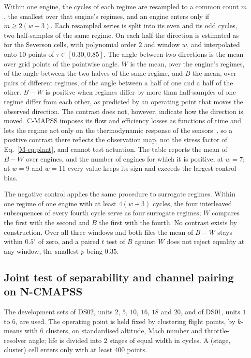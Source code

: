 \documentclass[12pt]{article}
\begin{document}
Within one engine, the cycles of each regime are resampled to a common count
$m$, the smallest over that engine's regimes, and an engine enters only if
$m\ge2(w+3)$. Each resampled series is split into its even and its odd
cycles, two half-samples of the same regime. On each half the direction is
estimated as for the Severson cells, with polynomial order $2$ and window $w$,
and interpolated onto $10$ points of $\tau\in[0.30,0.85]$. The angle between
two directions is the mean over grid points of the pointwise angle. $W$ is the
mean, over the engine's regimes, of the angle between the two halves of the
same regime, and $B$ the mean, over pairs of different regimes, of the angle
between a half of one and a half of the other. $B-W$ is positive when regimes
differ by more than half-samples of one regime differ from each other, as
predicted by an operating point that moves the observed direction. The
contrast does not, however, indicate how the direction is moved. C-MAPSS
imposes its flow and efficiency losses as functions of time and lets the
regime act only on the thermodynamic response of the
sensors~\cite{saxena2008}, so a positive contrast there reflects the
observation map, not the stress factor of Eq.~\eqref{M-eq:plant}, and cannot
test actuation. The table reports the mean of $B-W$ over engines, and the
number of engines for which it is positive, at $w=7$; at $w=9$ and $w=11$
every value keeps its sign and exceeds the largest control bias.

The negative control applies the same procedure to surrogate regimes. Within
one regime of one engine with at least $4(w+3)$ cycles, the four interleaved
subsequences of every fourth cycle serve as four surrogate regimes; $W$
compares the first with the second and $B$ the first with the fourth. No
contrast exists by construction. Over all three windows and both files the
mean of $B-W$ stays within $0.5^{\circ}$ of zero, and a paired $t$ test of
$B$ against $W$ does not reject equality at any window, the smallest $p$
being $0.35$.

\subsection{Joint test of separability and channel pairing on N-CMAPSS}

The development sets of DS02, units $2$, $5$, $10$, $16$, $18$ and $20$, and of
DS01, units $1$ to $6$, are used. The operating point is held fixed by
clustering flight points, by $k$-means with $6$ clusters, on standardised
altitude, Mach number and throttle-resolver angle; life is divided into $2$
stages of equal width in cycles. A (stage, cluster) cell enters only with at
least $400$ points.
\end{document}
